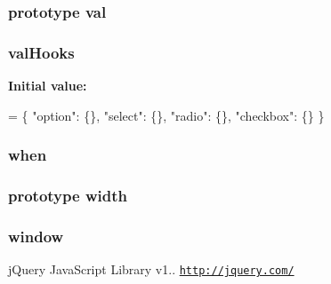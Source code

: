 \hypertarget{jquery-1_810_82-vsdoc_8js_a0888cacd53defa08fbb4972d54ece4b0}{
\subsubsection[{val}]{ {\bf prototype} val}}\label{jquery-1_810_82-vsdoc_8js_a0888cacd53defa08fbb4972d54ece4b0}
\hypertarget{jquery-1_810_82-vsdoc_8js_abd13691499fe1269b0042dae2caec0c1}{
\subsubsection[{val\-Hooks}]{ val\-Hooks}}\label{jquery-1_810_82-vsdoc_8js_abd13691499fe1269b0042dae2caec0c1}
{\bfseries Initial value\-:}
\begin{DoxyCode}
= \{ \textcolor{stringliteral}{"option"}: \{\},
\textcolor{stringliteral}{"select"}: \{\},
\textcolor{stringliteral}{"radio"}: \{\},
\textcolor{stringliteral}{"checkbox"}: \{\} \}
\end{DoxyCode}
\hypertarget{jquery-1_810_82-vsdoc_8js_ad5b56e8490e5084272548eebb74b82d6}{
\subsubsection[{when}]{ when}}\label{jquery-1_810_82-vsdoc_8js_ad5b56e8490e5084272548eebb74b82d6}
\hypertarget{jquery-1_810_82-vsdoc_8js_ac02818d8d1572403600aa377a993fc3e}{
\subsubsection[{width}]{ {\bf prototype} width}}\label{jquery-1_810_82-vsdoc_8js_ac02818d8d1572403600aa377a993fc3e}
\hypertarget{jquery-1_810_82-vsdoc_8js_a04a8a2bbfa9c15500892b8e5033d625b}{
\subsubsection[{window}]{\setlength{\rightskip}{0pt plus 5cm}window}}\label{jquery-1_810_82-vsdoc_8js_a04a8a2bbfa9c15500892b8e5033d625b}
j\-Query Java\-Script Library v1.. \href{http://jquery.com/}{\tt http\-://jquery.\-com/}

